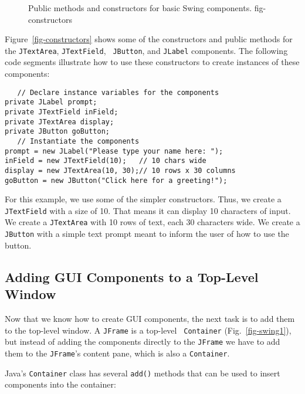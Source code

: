 \begin{figure}[tb]
{Public methods and constructors for basic Swing components.
} {fig-constructors}

\end{figure}

Figure~\ref{fig-constructors} shows some of the constructors and
public methods for the {\tt JTextArea}, {\tt JTextField}, {\tt
JButton}, and {\tt JLabel} components. The following code segments
illustrate how to use these constructors to create instances of these
components:

\begin{jjjlisting}
\begin{lstlisting}
   // Declare instance variables for the components
private JLabel prompt;
private JTextField inField;
private JTextArea display;
private JButton goButton;
   // Instantiate the components
prompt = new JLabel("Please type your name here: ");
inField = new JTextField(10);   // 10 chars wide
display = new JTextArea(10, 30);// 10 rows x 30 columns
goButton = new JButton("Click here for a greeting!");
\end{lstlisting}
\end{jjjlisting}

\noindent
For this example, we use some of the simpler constructors. Thus, we
create a {\tt JTextField} with a size of 10. That means it can display
10 characters of input.  We create a {\tt JTextArea} with 10 rows of
text, each 30 characters wide. We create a {\tt JButton} with a simple
text prompt meant to inform the user of how to use the button.

\subsection{Adding GUI Components to a Top-Level Window}

Now that we know how to create GUI components, the next task is to add
them to the top-level window.  A {\tt JFrame} is a top-level {\tt
Container} (Fig.~\ref{fig-swing1}), but instead of adding the
components directly to the {\tt JFrame} we have to add them to the
{\tt JFrame}'s content pane, which is also a {\tt Container}.


\noindent Java's {\tt Container} class has several {\tt add()} methods that 
can be used to insert components into the container:

